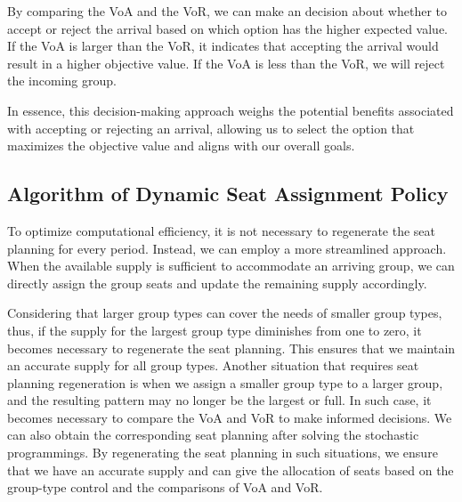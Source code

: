 By comparing the VoA and the VoR, we can make an decision about whether to accept or reject the arrival based on which option has the higher expected value. If the VoA is larger than the VoR, it indicates that accepting the arrival would result in a higher objective value. If the VoA is less than the VoR, we will reject the incoming group.



In essence, this decision-making approach weighs the potential benefits associated with accepting or rejecting an arrival, allowing us to select the option that maximizes the objective value and aligns with our overall goals.


\subsection{Algorithm of Dynamic Seat Assignment Policy}
To optimize computational efficiency, it is not necessary to regenerate the seat planning for every period. Instead, we can employ a more streamlined approach. When the available supply is sufficient to accommodate an arriving group, we can directly assign the group seats and update the remaining supply accordingly.

Considering that larger group types can cover the needs of smaller group types, thus, if the supply for the largest group type diminishes from one to zero, it becomes necessary to regenerate the seat planning. This ensures that we maintain an accurate supply for all group types.
Another situation that requires seat planning regeneration is when we assign a smaller group type to a larger group, and the resulting pattern may no longer be the largest or full. In such case, it becomes necessary to compare the VoA and VoR to make informed decisions. We can also obtain the corresponding seat planning after solving the stochastic programmings. By regenerating the seat planning in such situations, we ensure that we have an accurate supply and can give the allocation of seats based on the group-type control and the comparisons of VoA and VoR.


